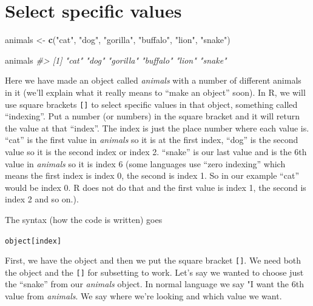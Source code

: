 \documentclass[
  12pt,
]{book}
\newenvironment{Shaded}{\begin{snugshade}}{\end{snugshade}}
\newcommand{\CommentTok}[1]{\textcolor[rgb]{0.37,0.37,0.37}{\textit{#1}}}
\newcommand{\KeywordTok}[1]{\textcolor[rgb]{0.27,0.27,0.27}{\textbf{#1}}}
\newcommand{\NormalTok}[1]{#1}
\newcommand{\StringTok}[1]{\textcolor[rgb]{0.5,0.5,0.5}{#1}}
\begin{document}
\hypertarget{select-specific-values}{%
\section{Select specific values}\label{select-specific-values}}

\begin{Shaded}
\begin{Highlighting}[]
\NormalTok{animals \textless{}{-}}\StringTok{ }\KeywordTok{c}\NormalTok{(}\StringTok{"cat"}\NormalTok{, }\StringTok{"dog"}\NormalTok{, }\StringTok{"gorilla"}\NormalTok{, }\StringTok{"buffalo"}\NormalTok{, }\StringTok{"lion"}\NormalTok{, }\StringTok{"snake"}\NormalTok{)}
\end{Highlighting}
\end{Shaded}

\begin{Shaded}
\begin{Highlighting}[]
\NormalTok{animals}
\CommentTok{\#\textgreater{} [1] "cat"     "dog"     "gorilla" "buffalo" "lion"    "snake"}
\end{Highlighting}
\end{Shaded}

Here we have made an object called \emph{animals} with a number of different animals in it (we'll explain what it really means to ``make an object'' soon). In R, we will use square brackets \texttt{{[}{]}} to select specific values in that object, something called ``indexing''. Put a number (or numbers) in the square bracket and it will return the value at that ``index''. The index is just the place number where each value is. ``cat'' is the first value in \emph{animals} so it is at the first index, ``dog'' is the second value so it is the second index or index 2. ``snake'' is our last value and is the 6th value in \emph{animals} so it is index 6 (some languages use ``zero indexing'' which means the first index is index 0, the second is index 1. So in our example ``cat'' would be index 0. R does not do that and the first value is index 1, the second is index 2 and so on.).

The syntax (how the code is written) goes

\texttt{object{[}index{]}}

First, we have the object and then we put the square bracket \texttt{{[}{]}}. We need both the object and the \texttt{{[}{]}} for subsetting to work. Let's say we wanted to choose just the ``snake'' from our \emph{animals} object. In normal language we say "I want the 6th value from \emph{animals}. We say where we're looking and which value we want.
\end{document}
